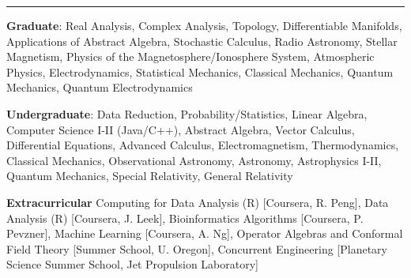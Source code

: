 \documentclass[10pt]{article}
\newcommand{\ressection}[1]{\noindent{\large\textbf{#1}}
\vspace{2pt}\hrule\vspace{4pt}}
\begin{document}
\ressection{Relevant Coursework}
\noindent\textbf{Graduate}:
    Real Analysis, Complex Analysis, Topology, Differentiable Manifolds,
    Applications of Abstract Algebra, Stochastic Calculus, 
    Radio Astronomy, Stellar Magnetism, Physics of the Magnetosphere/Ionosphere System,
    Atmospheric Physics, Electrodynamics, Statistical Mechanics,
    Classical Mechanics, Quantum Mechanics, Quantum Electrodynamics
\par\vspace{0.5em}
\noindent\textbf{Undergraduate}:
    Data Reduction, Probability/Statistics, Linear Algebra, Computer
    Science I-II (Java/C++), Abstract Algebra, Vector Calculus,
    Differential Equations, Advanced Calculus, Electromagnetism,
    Thermodynamics, Classical Mechanics, Observational Astronomy,
    Astronomy, Astrophysics I-II,  Quantum Mechanics, Special
    Relativity, General Relativity
\par\vspace{0.5em}
\noindent\textbf{Extracurricular}
    Computing for Data Analysis (R) [Coursera, R. Peng], Data Analysis
    (R) [Coursera, J. Leek], Bioinformatics Algorithms [Coursera, P.
    Pevzner], Machine Learning [Coursera, A. Ng], Operator Algebras and
    Conformal Field Theory [Summer School, U. Oregon], Concurrent
    Engineering [Planetary Science Summer School, Jet Propulsion
    Laboratory]
\end{document}
